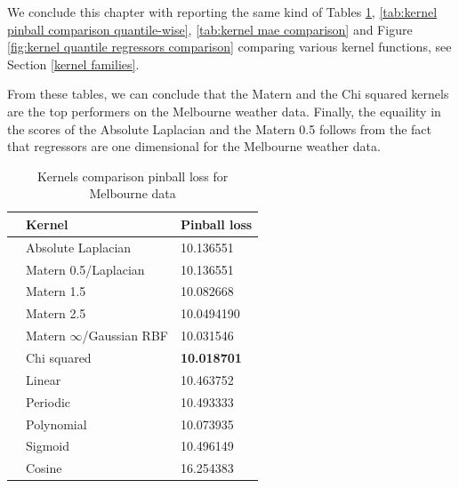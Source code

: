 We conclude this chapter with reporting the same kind of Tables \ref{tab:kernel pinball comparison}, \ref{tab:kernel pinball comparison quantile-wise}, \ref{tab:kernel mae comparison} and Figure \ref{fig:kernel quantile regressors comparison} comparing various kernel functions, see Section \ref{kernel families}.

From these tables, we can conclude that the Matern and the Chi squared kernels are the top performers on the Melbourne weather data. Finally, the equaility in the scores of the Absolute Laplacian and the Matern 0.5 follows from the fact that regressors are one dimensional for the Melbourne weather data.
\begin{table}[!h]
    \caption{Kernels comparison pinball loss for Melbourne data}
    \label{tab:kernel pinball comparison}
    \begin{center}
    \begin{tabular}{lll}
        \toprule
        & Kernel & Pinball loss
        \\
        \midrule
        & Absolute Laplacian &  10.136551 \\
        & Matern 0.5/Laplacian & 10.136551  \\
        & Matern 1.5 & 10.082668  \\
        & Matern 2.5 & 10.0494190    \\

        & Matern $\infty$/Gaussian RBF &  10.031546 \\

        & Chi squared & \textbf{10.018701}       \\
        
        & Linear & 10.463752    \\
        & Periodic  & 10.493333\\
        & Polynomial & 10.073935     \\
        & Sigmoid & 10.496149            \\
        & Cosine & 16.254383    \\
        \bottomrule
        \end{tabular}
    \end{center}
    \end{table}
    
